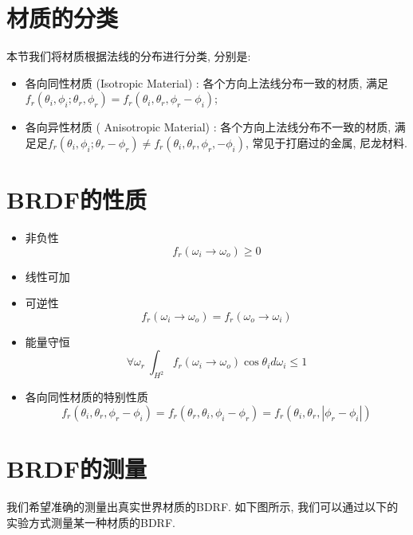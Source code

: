 \section{材质的分类}

本节我们将材质根据法线的分布进行分类, 分别是: 
\begin{itemize}
	\item 各向同性材质 (Isotropic Material) : 各个方向上法线分布一致的材质, 满足$f_r(\theta_i,\phi_i;\theta_r,\phi_r)=f_r(\theta_i,\theta_r,\phi_r-\phi_i)$; 
	\item 各向异性材质 ( Anisotropic Material) : 各个方向上法线分布不一致的材质, 满足足$f_r(\theta_i,\phi_i;\theta_r-\phi_r)\neq f_r(\theta_i,\theta_r,\phi_r,-\phi_i)$, 常见于打磨过的金属, 尼龙材料. 
\end{itemize}

\section{BRDF的性质}
\begin{itemize}
	\item 非负性
	\begin{equation}
		f_r(\omega_i\rightarrow \omega_o) \geq 0
	\end{equation}
	\item 线性可加
	\item 可逆性
	\begin{equation}
		f_r(\omega_i\rightarrow \omega_o)=f_r(\omega_o\rightarrow \omega_i)
	\end{equation}
	\item 能量守恒
	\begin{equation}
		\forall\omega_r\ \int_{H^2}f_r(\omega_i\rightarrow \omega_o)\cos\theta_id\omega_i\leq 1
	\end{equation}
	\item 各向同性材质的特别性质
	\begin{equation}
		f_r(\theta_i,\theta_r,\phi_r-\phi_i)=f_r(\theta_r,\theta_i,\phi_i-\phi_r)=f_r(\theta_i,\theta_r,|\phi_r-\phi_i|)
	\end{equation}
\end{itemize}

\section{BRDF的测量}

我们希望准确的测量出真实世界材质的BDRF. 如下图所示, 我们可以通过以下的实验方式测量某一种材质的BDRF. 

